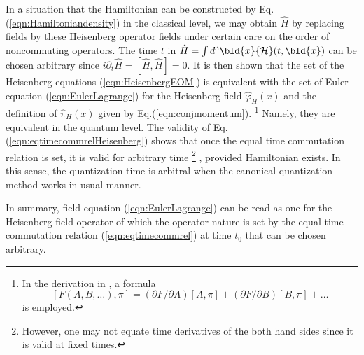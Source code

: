 In a situation that the Hamiltonian can be constructed by
Eq. (\ref{eqn:Hamiltoniandensity}) in the classical level,
we may obtain $\hat{H}$ by replacing fields by these Heisenberg operator fields
under certain care on the order of noncommuting operators.
The time $t$ in $\hat{H} = \int d^3 \bld{x} {\cal H}(t, \bld{x})$ can be chosen arbitrary since
$i \partial_t \hat{H} = [\hat{H}, \hat{H}] = 0$.
It is then shown\cite{ref:NIsh.1-2} that the set of the Heisenberg equations (\ref{eqn:HeisenbergEOM})
is equivalent with the set of Euler equation (\ref{eqn:EulerLagrange}) for the Heisenberg
field $\hat{\varphi}_H(x)$ and the definition of $\hat{\pi}_H(x)$ given by Eq.(\ref{eqn:conjmomentum}).
\footnote{
In the derivation in \cite{ref:NIsh.1-2}, a formula
\[
\left[ F(A, B, \dots), \pi \right]
=
(\partial F/ \partial A) [A, \pi] + (\partial F/ \partial B) [B, \pi] + \dots
\]
is employed.
} %
Namely, they are equivalent in the quantum level. 
The validity of Eq. (\ref{eqn:eqtimecommrelHeisenberg}) shows 
that once the equal time commutation relation is set, it is valid
for arbitrary time
\footnote{
However, one may not equate time derivatives
of the both hand sides since it is valid at fixed times. }
, provided Hamiltonian exists.
In this sense, the quantization time is arbitral when
the canonical quantization method works in usual manner.

In summary, field equation (\ref{eqn:EulerLagrange}) can be read as
one for the Heisenberg field operator of which the operator nature is
set by the equal time commutation relation (\ref{eqn:eqtimecommrel})
at time $t_0$ that can be chosen arbitrary.

